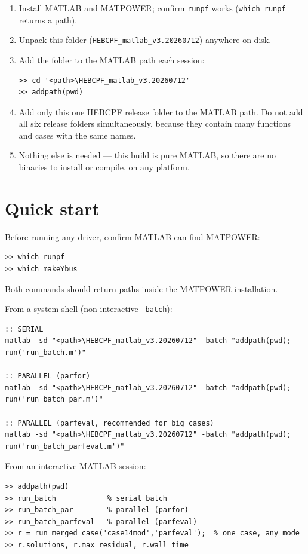 \documentclass[11pt,a4paper]{article}
\newcommand{\code}[1]{\texttt{#1}}
\begin{document}
\begin{enumerate}[leftmargin=1.6em]
  \item Install MATLAB and MATPOWER; confirm \code{runpf} works
        (\code{which runpf} returns a path).
  \item Unpack this folder (\code{HEBCPF_matlab_v3.20260712}) anywhere on disk.
  \item Add the folder to the MATLAB path each session:
\begin{lstlisting}
>> cd '<path>\HEBCPF_matlab_v3.20260712'
>> addpath(pwd)
\end{lstlisting}
  \item Add only this one HEBCPF release folder to the MATLAB path. Do not add all six
        release folders simultaneously, because they contain many functions and cases with
        the same names.
  \item Nothing else is needed --- this build is pure MATLAB, so there are no binaries to
        install or compile, on any platform.
\end{enumerate}

\section{Quick start}

Before running any driver, confirm MATLAB can find MATPOWER:
\begin{lstlisting}[style=mat]
>> which runpf
>> which makeYbus
\end{lstlisting}
Both commands should return paths inside the MATPOWER installation.

From a system shell (non-interactive \code{-batch}):
\begin{lstlisting}[style=sh]
:: SERIAL
matlab -sd "<path>\HEBCPF_matlab_v3.20260712" -batch "addpath(pwd); run('run_batch.m')"

:: PARALLEL (parfor)
matlab -sd "<path>\HEBCPF_matlab_v3.20260712" -batch "addpath(pwd); run('run_batch_par.m')"

:: PARALLEL (parfeval, recommended for big cases)
matlab -sd "<path>\HEBCPF_matlab_v3.20260712" -batch "addpath(pwd); run('run_batch_parfeval.m')"
\end{lstlisting}

From an interactive MATLAB session:
\begin{lstlisting}[style=mat]
>> addpath(pwd)
>> run_batch            % serial batch
>> run_batch_par        % parallel (parfor)
>> run_batch_parfeval   % parallel (parfeval)
>> r = run_merged_case('case14mod','parfeval');  % one case, any mode
>> r.solutions, r.max_residual, r.wall_time
\end{lstlisting}
\end{document}
